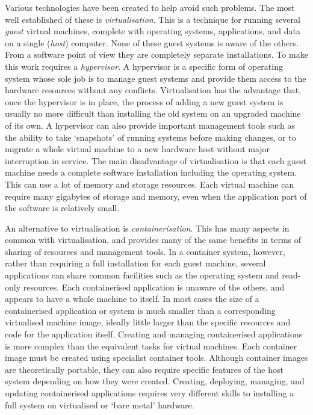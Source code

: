 Various technologies have been created to help avoid such problems. The most well established of these is \emph{\gls{virtualisation}}. This is a technique for running several \emph{guest} \gls{virtual machine}s, complete with operating systems, applications, and data on a single (\emph{host}) computer. None of these guest systems is aware of the others. From a software point of view they are completely separate installations. To make this work requires a \emph{hypervisor}. A \gls{hypervisor} is a specific form of \gls{operating system} whose sole job is to manage guest systems and provide them access to the hardware resources without any conflicts. Virtualisation has the advantage that, once the hypervisor is in place, the process of adding a new guest system is usually no more difficult than installing the old system on an upgraded machine of its own. A hypervisor can also provide important management tools such as the ability to take `snapshots' of running systems before making changes, or to migrate a whole virtual machine to a new hardware host without major interruption in service. The main disadvantage of virtualisation is that each guest machine needs a complete software installation including the operating system. This can use a lot of memory and storage resources. Each virtual machine can require many gigabytes of storage and memory, even when the application part of the software is relatively small.

An alternative to \gls{virtualisation} is \emph{\gls{containerisation}}. This has many aspects in common with virtualisation, and provides many of the same benefits in terms of sharing of resources and management tools. In a container system, however, rather than requiring a full installation for each guest machine, several applications can share common facilities such as the operating system and read-only resources. Each containerised application is unaware of the others, and appears to have a whole machine to itself. In most cases the size of a containerised application or system is much smaller than a corresponding virtualised machine image, ideally little larger than the specific resources and code for the application itself. Creating and managing containerised applications is more complex than the equivalent tasks for virtual machines. Each container image must be created using specialist container tools. Although container images are theoretically portable, they can also require specific features of the host system depending on how they were created. Creating, deploying, managing, and updating containerised applications requires very different skills to installing a full system on virtualised or `\gls{bare metal}' hardware.

